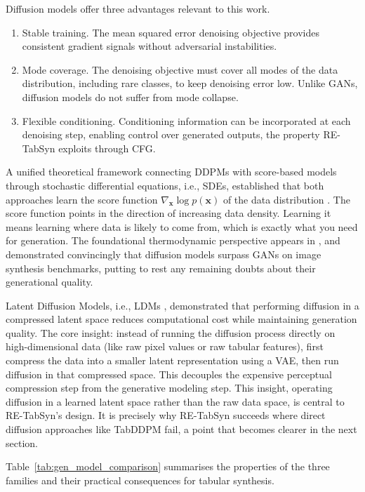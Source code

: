 Diffusion models offer three advantages relevant to this work.
\begin{enumerate}
    \item Stable training. The mean squared error denoising objective provides consistent gradient signals without adversarial instabilities.

    \item Mode coverage. The denoising objective must cover all modes of the data distribution, including rare classes, to keep denoising error low. Unlike GANs, diffusion models do not suffer from mode collapse.

    \item Flexible conditioning. Conditioning information can be incorporated at each denoising step, enabling control over generated outputs, the property RE-TabSyn exploits through CFG.
\end{enumerate}

A unified theoretical framework connecting DDPMs with score-based models through stochastic differential equations, i.e., SDEs, established that both approaches learn the score function $\nabla_\mathbf{x} \log p(\mathbf{x})$ of the data distribution \cite{song2021score}. The score function points in the direction of increasing data density. Learning it means learning where data is likely to come from, which is exactly what you need for generation. The foundational thermodynamic perspective appears in \cite{sohldickstein2015deep}, and \cite{dhariwal2021diffbeatgan} demonstrated convincingly that diffusion models surpass GANs on image synthesis benchmarks, putting to rest any remaining doubts about their generational quality.

Latent Diffusion Models, i.e., LDMs \cite{rombach2022ldm}, demonstrated that performing diffusion in a compressed latent space reduces computational cost while maintaining generation quality. The core insight: instead of running the diffusion process directly on high-dimensional data (like raw pixel values or raw tabular features), first compress the data into a smaller latent representation using a VAE, then run diffusion in that compressed space. This decouples the expensive perceptual compression step from the generative modeling step. This insight, operating diffusion in a learned latent space rather than the raw data space, is central to RE-TabSyn's design. It is precisely why RE-TabSyn succeeds where direct diffusion approaches like TabDDPM fail, a point that becomes clearer in the next section.

Table~\ref{tab:gen_model_comparison} summarises the properties of the three families and their practical consequences for tabular synthesis.

